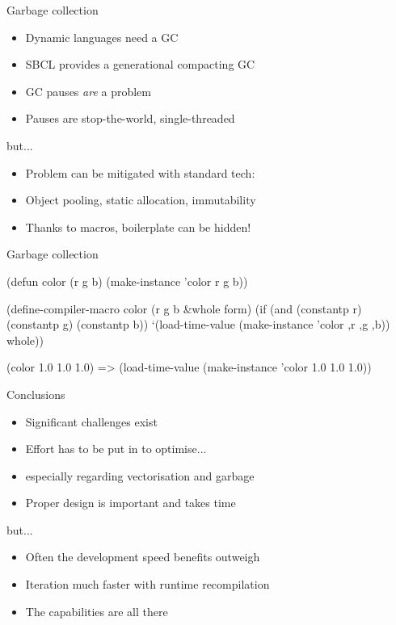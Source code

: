 \documentclass[14pt,t,aspectratio=169]{beamer}
\renewcommand{\title}[1]{
  {\huge #1} \vskip 0.4cm
}
\begin{document}
\begin{frame}
  \title{Garbage collection}
  \begin{itemize}
  \item Dynamic languages need a GC
  \item SBCL provides a generational compacting GC
  \item GC pauses \textit{are} a problem
  \item Pauses are stop-the-world, single-threaded
  \end{itemize}
  \pause\vfill
  but...
  \begin{itemize}
  \item Problem can be mitigated with standard tech:
  \item Object pooling, static allocation, immutability
  \item Thanks to macros, boilerplate can be hidden!
  \end{itemize}
\end{frame}

\begin{frame}[fragile]
  \title{Garbage collection}
\begin{lispcode}
(defun color (r g b)
  (make-instance 'color r g b))

(define-compiler-macro color (r g b &whole form)
  (if (and (constantp r)
           (constantp g)
           (constantp b))
      `(load-time-value (make-instance 'color ,r ,g ,b))
      whole))
\end{lispcode}
  \pause\vspace{0.5cm}
\begin{lispcode}
(color 1.0 1.0 1.0)
=> (load-time-value (make-instance 'color 1.0 1.0 1.0))
\end{lispcode}
\end{frame}

\begin{frame}
  \title{Conclusions}
  \begin{itemize}
  \item Significant challenges exist
  \item Effort has to be put in to optimise...
  \item especially regarding vectorisation and garbage
  \item Proper design is important and takes time
  \end{itemize}
  \pause\vfill
  but...
  \begin{itemize}
  \item Often the development speed benefits outweigh
  \item Iteration much faster with runtime recompilation
  \item The capabilities are all there
  \end{itemize}
\end{frame}
\end{document}
